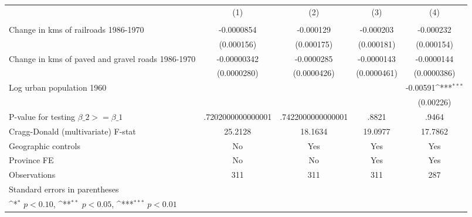 {
\def\sym#1{\ifmmode^{#1}\else\(^{#1}\)\fi}
\begin{tabular}{l*{4}{c}}
\hline\hline
                &\multicolumn{1}{c}{(1)}&\multicolumn{1}{c}{(2)}&\multicolumn{1}{c}{(3)}&\multicolumn{1}{c}{(4)}\\
                &\multicolumn{1}{c}{}&\multicolumn{1}{c}{}&\multicolumn{1}{c}{}&\multicolumn{1}{c}{}\\
\hline
Change in kms of railroads 1986-1970&-0.0000854         &-0.000129         &-0.000203         &-0.000232         \\
                &(0.000156)         &(0.000175)         &(0.000181)         &(0.000154)         \\
[1em]
Change in kms of paved and gravel roads 1986-1970&-0.00000342         &-0.0000285         &-0.0000143         &-0.0000144         \\
                &(0.0000280)         &(0.0000426)         &(0.0000461)         &(0.0000386)         \\
[1em]
Log urban population 1960&                  &                  &                  & -0.00591\sym{***}\\
                &                  &                  &                  &(0.00226)         \\
\hline
P-value for testing $\beta\_{2} >= \beta\_{1}$&.7202000000000001         &.7422000000000001         &    .8821         &    .9464         \\
Cragg-Donald (multivariate) F-stat&  25.2128         &  18.1634         &  19.0977         &  17.7862         \\
Geographic controls&       No         &      Yes         &      Yes         &      Yes         \\
Province FE     &       No         &       No         &      Yes         &      Yes         \\
Observations    &      311         &      311         &      311         &      287         \\
\hline\hline
\multicolumn{5}{l}{\footnotesize Standard errors in parentheses}\\
\multicolumn{5}{l}{\footnotesize \sym{*} \(p<0.10\), \sym{**} \(p<0.05\), \sym{***} \(p<0.01\)}\\
\end{tabular}
}
